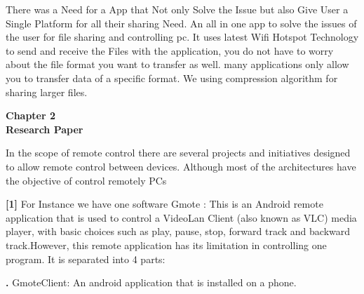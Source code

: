 \documentclass[12pt]{article}
\begin{document}
There was a Need for a App that Not only Solve the Issue but also Give User a
Single Platform for all their sharing Need. An all in one app to solve the issues of
the user for file sharing and controlling pc. It uses latest Wifi Hotspot Technology
to send and receive the Files with the application, you do not have to worry about
the file format you want to transfer as well. many applications only allow you to
transfer data of a specific format. We using compression algorithm for sharing
larger files.\\[10mm]\par



\clearpage



\begin{center}
 \LARGE \textbf {Chapter 2 }\\[10mm]
 \Large \textbf{Research Paper}\\[10mm]
 \end{center}
In the scope of remote control there are several projects and initiatives designed to
allow remote control between devices. Although most of the architectures have the
objective of control remotely PCs\par
\textbf{[1]} For Instance we have one software Gmote : This is an Android remote application
that is used to control a VideoLan Client (also known as VLC) media player, with basic
choices such as play, pause, stop, forward track and backward track.However, this
remote application has its limitation in controlling one program. It is separated into 4
parts:

\textbf. GmoteClient: An android application that is installed on a phone.
\end{document}
